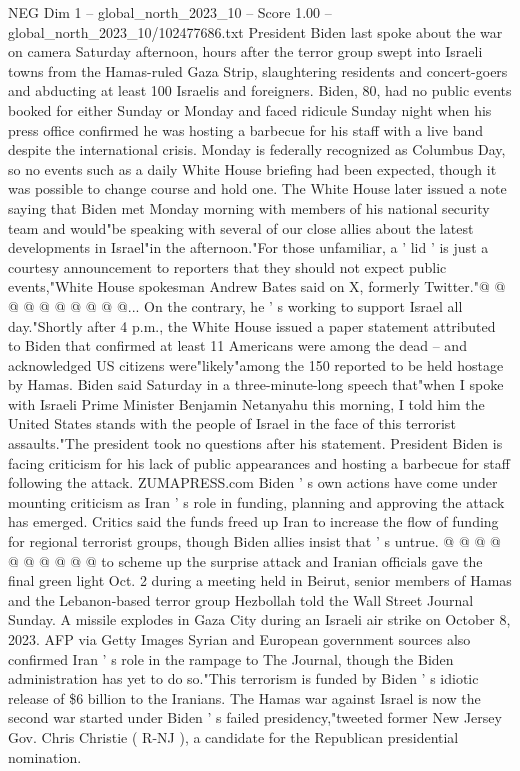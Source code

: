 \begin{textsample}{NEG Dim 1 – global\_north\_2023\_10 – Score 1.00 – global\_north\_2023\_10/102477686.txt}  \label{ex:f1_neg_138}
President Biden last spoke about the war on camera Saturday afternoon, hours after the terror group swept into Israeli towns from the Hamas-ruled Gaza Strip, slaughtering residents and concert-goers and abducting at least 100 Israelis and foreigners.
Biden, 80, had no public events booked for either Sunday or Monday and faced ridicule Sunday night when his press office confirmed he was hosting a barbecue for his staff with a live band despite the international crisis.
Monday is federally recognized as Columbus Day, so no events such as a daily White House briefing had been expected, though it was possible to change course and hold one.
The White House later issued a note saying that Biden met Monday morning with members of his national security team and would"be speaking with several of our close allies about the latest developments in Israel"in the afternoon."For those unfamiliar, a ' lid ' is just a courtesy announcement to reporters that they should not expect public events,"White House spokesman Andrew Bates said on X, formerly Twitter."@ @ @ @ @ @ @ @ @ @...
On the contrary, he ' s working to support Israel all day."Shortly after 4 p.m., the White House issued a paper statement attributed to Biden that confirmed at least 11 Americans were among the dead -- and acknowledged US citizens were"likely"among the 150 reported to be held hostage by Hamas.
Biden said Saturday in a three-minute-long speech that"when I spoke with Israeli Prime Minister Benjamin Netanyahu this morning, I told him the United States stands with the people of Israel in the face of this terrorist assaults."The president took no questions after his statement.
President Biden is facing criticism for his lack of public appearances and hosting a barbecue for staff following the attack.
ZUMAPRESS.com Biden ' s own actions have come under mounting criticism as Iran ' s role in funding, planning and approving the attack has emerged.
Critics said the funds freed up Iran to increase the flow of funding for regional terrorist groups, though Biden allies insist that ' s untrue. @ @ @ @ @ @ @ @ @ @ to scheme up the surprise attack and Iranian officials gave the final green light Oct. 2 during a meeting held in Beirut, senior members of Hamas and the Lebanon-based terror group Hezbollah told the Wall Street Journal Sunday.
A missile explodes in Gaza City during an Israeli air strike on October 8, 2023.
AFP via Getty Images Syrian and European government sources also confirmed Iran ' s role in the rampage to The Journal, though the Biden administration has yet to do so."This terrorism is funded by Biden ' s idiotic release of \$6 billion to the Iranians.
The Hamas war against Israel is now the second war started under Biden ' s failed presidency,"tweeted former New Jersey Gov.
Chris Christie ( R-NJ ), a candidate for the Republican presidential nomination.

\end{textsample}
